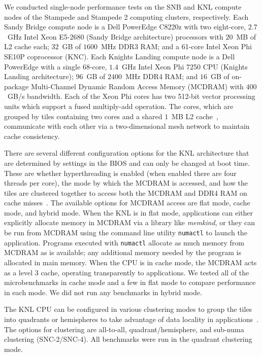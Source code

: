 We conducted single-node performance tests on the SNB and KNL compute nodes of the
Stampede and Stampede 2 computing clusters, respectively. Each Sandy Bridge compute node
is a Dell PowerEdge C8220z with two eight-core, $2.7$~GHz Intel Xeon
E5-2680 (Sandy Bridge architecture) processors with $20$~MB of L2 cache each; $32$~GB of
$1600$~MHz DDR3 RAM; and a 61-core Intel Xeon Phi SE10P coprocessor (KNC). Each Knights Landing
compute node is a Dell PowerEdge with a single 68-core, $1.4$~GHz Intel
Xeon Phi 7250 CPU (Knights Landing architecture); $96$~GB of $2400$~MHz DDR4 RAM; and
$16$~GB of on-package Multi-Channel Dynamic Random Access Memory (MCDRAM) with $400$~GB/s
bandwidth. Each of the Xeon Phi cores has two 512-bit vector processing units which
support a fused multiply-add operation. The cores, which are grouped by tiles containing
two cores and a shared $1$~MB L2 cache~\cite{intel:xeonphi}, communicate with each other
via a two-dimensional mesh network to maintain cache consistency.

There are several different configuration options for the KNL architecture that are
determined by settings in the BIOS and can only be changed at boot time. These are whether
hyperthreading is enabled (when enabled there are four threads per core), the mode by
which the MCDRAM is accessed, and how the tiles are clustered together to access both the
MCDRAM and DDR4 RAM on cache misses~\cite{vladimirov:knlModes, asai:mcdramKnl}.  The
available options for MCDRAM access are flat mode, cache mode, and hybrid mode.  When the
KNL is in flat mode, applications can either explicitly allocate memory in MCDRAM via a
library like \textit{memkind}, or they can be run from MCDRAM using the command line
utility \texttt{numactl} to launch the application. Programs executed with
\texttt{numactl} allocate as much memory from MCDRAM as is available; any additional
memory needed by the program is allocated in main memory. When the CPU is in cache mode,
the MCDRAM acts as a level 3 cache, operating transparently to applications. We tested all
of the microbenchmarks in cache mode and a few in flat mode to compare performance in each
mode. We did not run any benchmarks in hybrid mode.

The KNL CPU can be configured in various clustering modes to group the tiles into
quadrants or hemispheres to take advantage of data locality in
applications~\cite{vladimirov:knlModes}. The options for clustering are all-to-all,
quadrant/hemisphere, and sub-numa clustering (SNC-2/SNC-4). All benchmarks were run in the
quadrant clustering mode.

